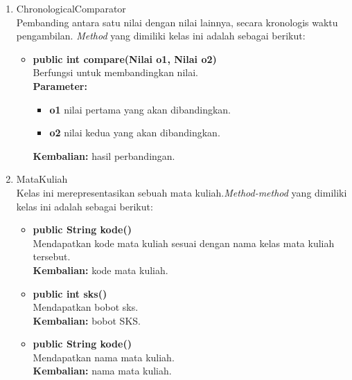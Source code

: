 \begin{enumerate}
\begin{enumerate}
		\item ChronologicalComparator\\
		Pembanding antara satu nilai dengan nilai lainnya, secara kronologis waktu pengambilan. \textit{Method} yang dimiliki kelas ini adalah sebagai berikut:
		
		\begin{itemize}
			\item \textbf{public int compare(Nilai o1, Nilai o2) } \\
			Berfungsi untuk membandingkan nilai. \\
			\textbf{Parameter:}
			\begin{itemize}
				\item \textbf{o1} nilai pertama yang akan dibandingkan.
				\item \textbf{o2} nilai kedua yang akan dibandingkan.
			\end{itemize}
			\textbf{Kembalian:} hasil perbandingan.
		\end{itemize}
		
		\item MataKuliah\\
		Kelas ini merepresentasikan sebuah mata kuliah.\textit{Method-method} yang dimiliki kelas ini adalah sebagai berikut:	
		\begin{itemize}
			\item \textbf{public String kode()} \\
			Mendapatkan kode mata kuliah sesuai dengan nama kelas mata kuliah tersebut. \\
			\textbf{Kembalian:} kode mata kuliah.
			\item \textbf{public int sks()} \\
			Mendapatkan bobot sks. \\
			\textbf{Kembalian:} bobot SKS.
			\item \textbf{public String kode()} \\
			Mendapatkan nama mata kuliah. \\
			\textbf{Kembalian:} nama mata kuliah.
		\end{itemize}
		

\end{enumerate}
\end{enumerate}
